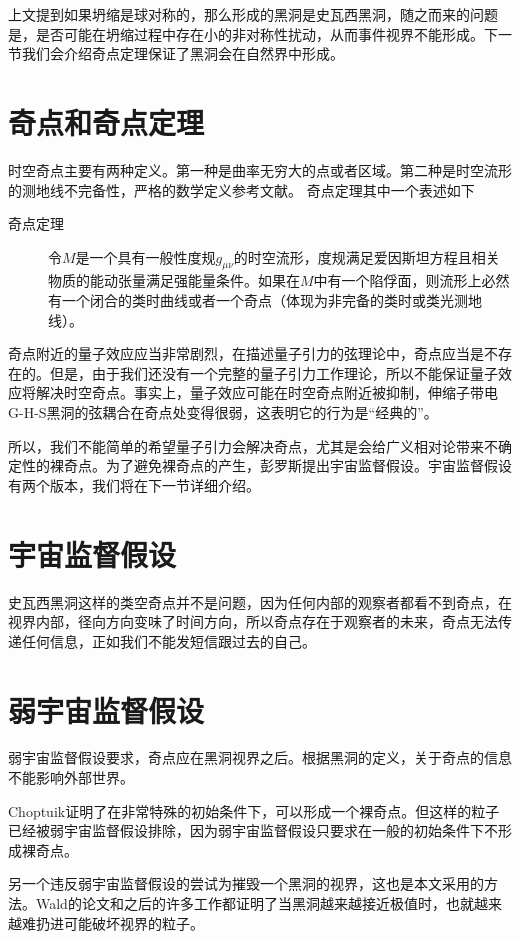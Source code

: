 上文提到如果坍缩是球对称的，那么形成的黑洞是史瓦西黑洞，随之而来的问题是，是否可能在坍缩过程中存在小的非对称性扰动，从而事件视界不能形成。下一节我们会介绍奇点定理保证了黑洞会在自然界中形成。

\section{奇点和奇点定理}
时空奇点主要有两种定义。第一种是曲率无穷大的点或者区域。第二种是时空流形的测地线不完备性，严格的数学定义参考文献\citep{penrose1999question}。
奇点定理其中一个表述如下\citep{陈斌2018广义相对论}

\begin{description}
    \item[奇点定理]  令$M$是一个具有一般性度规$g_{\mu \nu}$的时空流形，度规满足爱因斯坦方程且相关物质的能动张量满足强能量条件。如果在$M$中有一个陷俘面，则流形上必然有一个闭合的类时曲线或者一个奇点（体现为非完备的类时或类光测地线）。
\end{description}

奇点附近的量子效应应当非常剧烈，在描述量子引力的弦理论中，奇点应当是不存在的。但是，由于我们还没有一个完整的量子引力工作理论，所以不能保证量子效应将解决时空奇点。事实上，量子效应可能在时空奇点附近被抑制，伸缩子带电G-H-S黑洞的弦耦合在奇点处变得很弱，这表明它的行为是“经典的”\citep{ong2020space}。

所以，我们不能简单的希望量子引力会解决奇点，尤其是会给广义相对论带来不确定性的裸奇点。为了避免裸奇点的产生，彭罗斯提出宇宙监督假设。宇宙监督假设有两个版本，我们将在下一节详细介绍。

\section{宇宙监督假设}
史瓦西黑洞这样的类空奇点并不是问题，因为任何内部的观察者都看不到奇点，在视界内部，径向方向变味了时间方向，所以奇点存在于观察者的未来，奇点无法传递任何信息，正如我们不能发短信跟过去的自己。
\section{弱宇宙监督假设}
弱宇宙监督假设要求，奇点应在黑洞视界之后。根据黑洞的定义，关于奇点的信息不能影响外部世界。

Choptuik证明了在非常特殊的初始条件下\citep{choptuik1993universality}，可以形成一个裸奇点。但这样的粒子已经被弱宇宙监督假设排除，因为弱宇宙监督假设只要求在一般的初始条件下不形成裸奇点。

另一个违反弱宇宙监督假设的尝试为摧毁一个黑洞的视界，这也是本文采用的方法。Wald的论文\citep{wald1974gedanken}和之后的许多工作都证明了当黑洞越来越接近极值时，也就越来越难扔进可能破坏视界的粒子。

